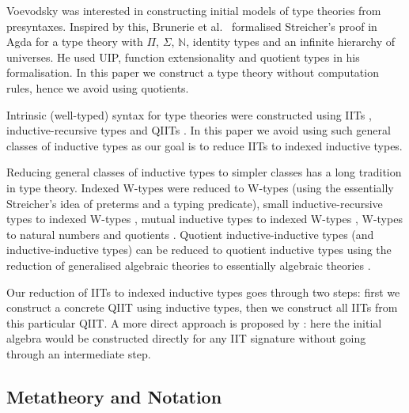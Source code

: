 \documentclass[a4paper,UKenglish,cleveref, autoref]{lipics-v2019}
\begin{document}
Voevodsky was interested in constructing initial models of type
theories from presyntaxes. Inspired by this, Brunerie et al.\ \cite{brunerie}
formalised Streicher's proof in Agda for a type theory with $\Pi$,
$\Sigma$, $\mathbb{N}$, identity types and an infinite hierarchy of
universes. He used UIP, function extensionality and quotient types in
his formalisation. In this paper we construct a type theory without
computation rules, hence we avoid using quotients.

Intrinsic (well-typed) syntax for type theories were constructed using
IITs \cite{chapman09eatitself}, inductive-recursive types
\cite{nisse,Altenkirch:2014:CO:2631172.2631176} and QIITs
\cite{ttintt}. In this paper we avoid using such general classes of
inductive types as our goal is to reduce IITs to indexed inductive
types.

Reducing general classes of inductive types to simpler classes has a
long tradition in type theory. Indexed W-types were reduced to W-types
\cite{indexedcont} (using the essentially Streicher's idea of preterms
and a typing predicate), small inductive-recursive types to indexed
W-types \cite{malatasta13smallir}, mutual inductive types to indexed
W-types \cite{mutual}, W-types to natural numbers and quotients
\cite{Ahrens2019}. Quotient inductive-inductive types (and
inductive-inductive types) can be reduced to quotient inductive types
using the reduction of generalised algebraic theories to essentially
algebraic theories \cite{gat}.

Our reduction of IITs to indexed inductive types goes through two
steps: first we construct a concrete QIIT using inductive types, then
we construct all IITs from this particular QIIT. A more direct
approach is proposed by \cite{erasure}: here the initial algebra would
be constructed directly for any IIT signature without going through an
intermediate step.

\subsection{Metatheory and Notation}
\end{document}
